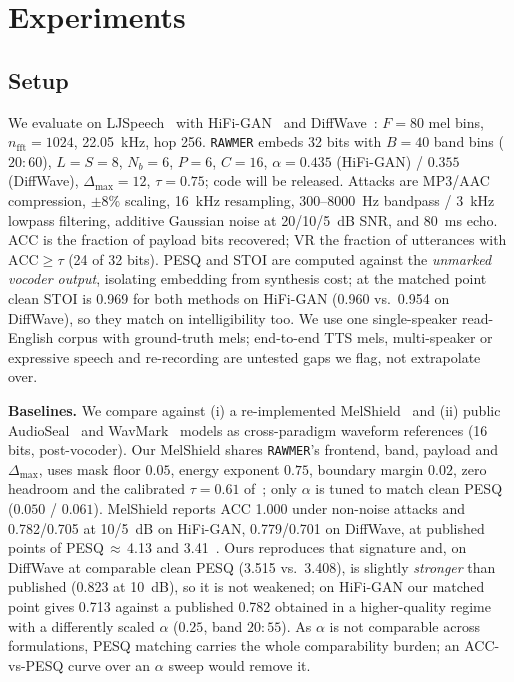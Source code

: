 \section{Experiments}
\label{sec:experiments}

\subsection{Setup}

We evaluate on LJSpeech~\cite{ljspeech2017} with HiFi-GAN~\cite{kong2020} and
DiffWave~\cite{kong2021}: $F = 80$ mel bins, $n_{\text{fft}} = 1024$, 22.05~kHz, hop
256. \texttt{RAWMER} embeds 32 bits with $B = 40$ band bins ($20\!:\!60$),
$L = S = 8$, $N_b = 6$, $P = 6$, $C = 16$, $\alpha = 0.435$ (HiFi-GAN) / $0.355$
(DiffWave), $\Delta_{\max} = 12$, $\tau = 0.75$; code will be released. Attacks are MP3/AAC compression, $\pm 8\%$ scaling, 16~kHz resampling,
300--8000~Hz bandpass / 3~kHz lowpass filtering, additive Gaussian noise at 20/10/5~dB
SNR, and 80~ms echo. ACC is the fraction of payload bits recovered; VR the fraction of
utterances with $\text{ACC} \geq \tau$ (24 of 32 bits). PESQ and STOI are computed
against the \emph{unmarked vocoder output}, isolating embedding from synthesis cost; at
the matched point clean STOI is 0.969 for both methods on HiFi-GAN (0.960 vs.\ 0.954 on
DiffWave), so they match on intelligibility too. We use one single-speaker read-English
corpus with ground-truth mels; end-to-end TTS mels, multi-speaker or expressive speech
and re-recording are untested gaps we flag, not extrapolate over.




\textbf{Baselines.} We compare against (i) a re-implemented MelShield~\cite{jin2026}
and (ii) public AudioSeal~\cite{san2024} and WavMark~\cite{chen2023} models as
cross-paradigm waveform references (16 bits, post-vocoder). Our MelShield shares \texttt{RAWMER}'s frontend, band, payload and $\Delta_{\max}$,
uses mask floor $0.05$, energy exponent $0.75$, boundary margin $0.02$, zero headroom
and the calibrated $\tau = 0.61$ of~\cite{jin2026}; only $\alpha$ is tuned to match
clean PESQ ($0.050$ / $0.061$). MelShield reports ACC 1.000 under
non-noise attacks and 0.782/0.705 at 10/5~dB on HiFi-GAN, 0.779/0.701 on DiffWave, at
published points of PESQ\,$\approx$\,4.13 and 3.41~\cite{jin2026}. Ours reproduces
that signature and, on DiffWave at comparable clean PESQ (3.515 vs.\ 3.408), is
slightly \emph{stronger} than published (0.823 at 10~dB), so it is not weakened; on
HiFi-GAN our matched point gives 0.713 against a published 0.782 obtained in a
higher-quality regime with a differently scaled $\alpha$ ($0.25$, band $20\!:\!55$).
As $\alpha$ is not comparable across formulations, PESQ matching carries the whole
comparability burden; an ACC-vs-PESQ curve over an $\alpha$ sweep would remove it.

